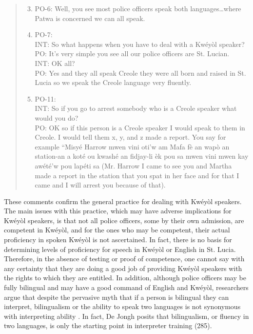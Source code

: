 \documentclass[output=paper,colorlinks,citecolor=brown]{langscibook}
\begin{document}
\begin{quote}
    \begin{enumerate}
    \setcounter{enumi}{2}
        \item PO-6: Well, you see most police officers speak both languages…where Patwa is  concerned we can all speak.
        
        \item PO-7: \\
        INT: So what happens when you have to deal with a Kwéyòl speaker? \\
        PO: It's very simple you see all our police officers are St. Lucian. \\
        INT: OK all? \\
        PO: Yes and they all speak Creole they were all born and raised in St. Lucia so  we speak the Creole language very fluently.

        \item PO-11: \\
        INT: So if you go to arrest somebody who is a Creole speaker what would you do?\\
        PO: OK so if this person is a Creole speaker I would speak to them in Creole. I would tell them x, y, and z made a report. You say for example “Misyé Harrow mwen vini oti’w am Mafa fè an wapò an station-an a koté ou kwashé an fidjay-li èk pou sa mwen vini mwen kay awété’w pou lapéti sa (Mr. Harrow I came to see you and Martha made a report in the station that you spat in her face and for that I came and I will arrest you because of that).
    \end{enumerate}
\end{quote}

These comments confirm the general practice for dealing with Kwéyòl speakers. The main issues with this practice, which may have adverse implications for Kwéyòl speakers, is that not all police officers, some by their own admission, are competent in Kwéyòl, and for the ones who may be competent, their actual proficiency in spoken Kwéyòl is not ascertained. In fact, there is no basis for determining levels of proficiency for speech in Kwéyòl or English in St. Lucia. Therefore, in the absence of testing or proof of competence, one cannot say with any certainty that they are doing a good job of providing Kwéyòl speakers with the rights to which they are entitled. In addition, although police officers may be fully bilingual and may have a good command of English and Kwéyòl, researchers argue that despite the pervasive myth that if a person is bilingual they can interpret, bilingualism or the ability to speak two languages is not synonymous with interpreting ability \citep{GonzalesGonzalesMikkelson1991}. In fact, De Jongh posits that bilingualism, or fluency in two languages, is only the starting point in interpreter training (285). 
\end{document}
